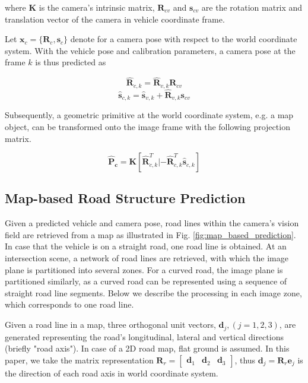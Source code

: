 \documentclass[letterpaper, 10 pt, conference]{ieeeconf}  %
\begin{document}
where $\mathbf{K}$ is the camera's intrinsic matrix, $\mathbf{R}_{cv}$ and $\mathbf{s}_{cv}$ are the rotation matrix and translation vector of the camera in vehicle coordinate frame.

Let $\mathbf{x}_{c} = \{\mathbf{R}_{c}, \mathbf{s}_{c}\}$ denote for a camera pose with respect to the world coordinate system. With the vehicle pose and calibration parameters, a camera pose at the frame $k$ is thus predicted as

\begin{equation}
\hat{\mathbf{R}}_{c,k} = \hat{\mathbf{R}}_{v,k} \mathbf{R}_{cv}
\label{eq:R_c}
\end{equation}
\begin{equation}
\hat{\mathbf{s}}_{c,k} = \hat{\mathbf{s}}_{v,k} + \hat{\mathbf{R}}_{v,k} \mathbf{s}_{cv}
\label{eq:S_c}
\end{equation}

Subsequently, a geometric primitive at the world coordinate system, e.g. a map object, can be transformed onto the image frame with the following projection matrix.

\begin{equation}
\mathbf{\hat{P}_{c}}=\mathbf{K}[\hat{\mathbf{R}}_{c,k}^T|-\hat{\mathbf{R}}_{c,k}^T\hat{\mathbf{s}}_{c,k}]
\end{equation}

\subsection{Map-based Road Structure Prediction}

Given a predicted vehicle and camera pose, road lines within the camera's vision field are retrieved from a map as illustrated in Fig. \ref{fig:map_based_prediction}. In case that the vehicle is on a straight road, one road line is obtained. At an intersection scene, a network of road lines are retrieved, with which the image plane is partitioned into several zones. For a curved road, the image plane is partitioned similarly, as a curved road can be represented using a sequence of straight road line segments. Below we describe the processing in each image zone, which corresponds to one road line.

Given a road line in a map, three orthogonal unit vectors, $\mathbf{d}_j, (j=1,2,3)$, are generated representing the road's longitudinal, lateral and vertical directions (briefly "road axis"). In case of a 2D road map, flat ground is assumed. In this paper, we take the matrix representation $\mathbf{R}_r = \begin{bmatrix} \mathbf{d}_1 & \mathbf{d}_2 & \mathbf{d}_3 \end{bmatrix}$, thus $\mathbf{d}_j = \mathbf{R}_r\mathbf{e}_j$ is the direction of each road axis in world coordinate system.
\end{document}
